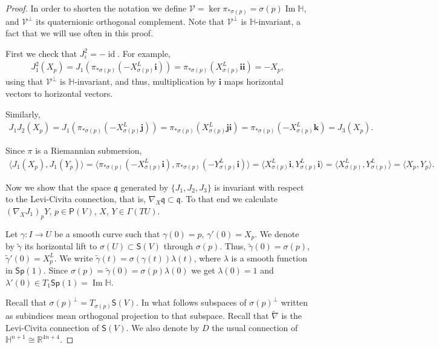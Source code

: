 \documentclass[12pt, a4paper]{amsart}
\newcommand{\id}{\operatorname{id}}
\newcommand{\g}{\mathfrak}
\newcommand{\R}{\mathbb{R}}
\renewcommand{\H}{\mathbb{H}}
\renewcommand{\Im}{\operatorname{Im}}
\newcommand{\Sp}{\mathsf{Sp}}
\theoremstyle{remark}
\begin{document}
\begin{proof}
In order to shorten the notation we define $\mathcal{V}=\ker\pi_{*\sigma(p)}=\sigma(p)\Im\H$, and $\mathcal{V}^\perp$ its quaternionic orthogonal complement.
Note that ${\mathcal{V}}^\perp$ is $\H$-invariant, a fact that we will use often in this proof.

First we check that $J_i^2=-\id$.
For example, 
\[
\begin{aligned}
J_1^2(X_p)
=J_1(\pi_{*\sigma(p)}(-X_{\sigma(p)}^L\mathbf{i}))
=\pi_{*\sigma(p)}(X_{\sigma(p)}^L\mathbf{i}\mathbf{i})
=-X_p,
\end{aligned}
\]
using that $\mathcal{V}^\perp$ is $\H$-invariant, and thus, multiplication by $\mathbf{i}$ maps horizontal vectors to horizontal vectors.

Similarly,
\[
\begin{aligned}
J_1 J_2(X_p)
=J_1(\pi_{*\sigma(p)}(-X_{\sigma(p)}^L\mathbf{j}))
=\pi_{*\sigma(p)}(X_{\sigma(p)}^L\mathbf{j}\mathbf{i})
=\pi_{*\sigma(p)}(-X_{\sigma(p)}^L\mathbf{k})
=J_3(X_p).
\end{aligned}
\]

Since $\pi$ is a Riemannian submersion,
\[
\begin{aligned}
\langle J_1(X_p),J_1(Y_p)\rangle
=\langle \pi_{*\sigma(p)}(-X_{\sigma(p)}^L\mathbf{i}),\pi_{*\sigma(p)}(-Y_{\sigma(p)}^L\mathbf{i})\rangle
=\langle X_{\sigma(p)}^L\mathbf{i}, Y_{\sigma(p)}^L\mathbf{i}\rangle
=\langle X_{\sigma(p)}^L, Y_{\sigma(p)}^L\rangle
=\langle X_p,Y_p\rangle.
\end{aligned}
\]

Now we show that the space $\g{q}$ generated by $\{J_1,J_2,J_3\}$ is invariant with respect to the Levi-Civita connection, that is, $\nabla_X\g{q}\subset\g{q}$.
To that end we calculate $(\nabla_X J_1)_p Y$, $p\in \mathsf{P}(V)$, $X$, $Y\in\Gamma(TU)$.

Let $\gamma\colon I\to U$ be a smooth curve such that $\gamma(0)=p$, $\gamma'(0)=X_p$.
We denote by $\tilde{\gamma}$ its horizontal lift to $\sigma(U)\subset\mathsf{S}(V)$ through $\sigma(p)$.
Thus, $\tilde{\gamma}(0)=\sigma(p)$, $\tilde{\gamma}'(0)=X_p^L$.
We write $\tilde{\gamma}(t)=\sigma(\gamma(t))\lambda(t)$, where $\lambda$ is a smooth function in $\Sp(1)$.
Since $\sigma(p)=\tilde{\gamma}(0)=\sigma(p)\lambda(0)$ we get $\lambda(0)=1$ and $\lambda'(0)\in T_1\Sp(1)=\Im\H$.

Recall that $\sigma(p)^\perp=T_{\sigma(p)}\mathsf{S}(V)$. In what follows subspaces of $\sigma(p)^\perp$ written as subindices mean orthogonal projection to that subspace.
Recall that $\tilde{\nabla}$ is the Levi-Civita connection of $\mathsf{S}(V)$.
We also denote by $D$ the usual connection of $\H^{n+1}\cong\R^{4n+4}$.


\end{proof}
\end{document}
